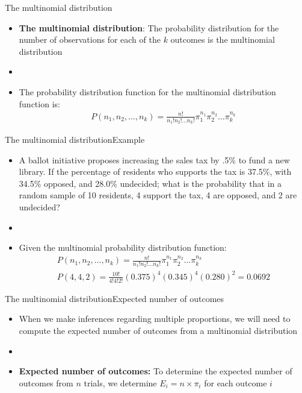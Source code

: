 \documentclass[xcolor=dvipsnames]{beamer}
\begin{document}
\begin{frame}{The multinomial distribution}
	\begin{itemize}
		\item \textbf{The multinomial distribution}: The probability distribution for the number of observations for each of the $k$ outcomes is the multinomial distribution \pause
		\item[]
		\item The probability distribution function for the multinomial distribution function is: \pause
		\begin{gather*}
			P(n_1, n_2, \hdots, n_k) = \frac{n!}{n_1!n_2!\hdots n_k!}\pi_1^{n_1}\pi_2^{n_2}\hdots \pi_k^{n_k}
		\end{gather*}
	\end{itemize}
\end{frame}

\begin{frame}{The multinomial distribution}{Example}
	\begin{itemize}
		\item A ballot initiative proposes increasing the sales tax by .5\% to fund a new library. If the percentage of residents who supports the tax is 37.5\%, with 34.5\% opposed, and 28.0\% undecided; what is the probability that in a random sample of 10 residents, 4 support the tax, 4 are opposed, and 2 are undecided? \pause
		\item[]
		\item Given the multinomial probability distribution function: \pause
		\begin{gather*}
			P(n_1, n_2, \hdots, n_k) = \frac{n!}{n_1!n_2!\hdots n_k!}\pi_1^{n_1}\pi_2^{n_2}\hdots \pi_k^{n_k} \\
			P(4, 4, 2) = \frac{10!}{4!4!2!}(0.375)^{4}(0.345)^{4}(0.280)^{2} = 0.0692
		\end{gather*}
	\end{itemize}
\end{frame}

\begin{frame}{The multinomial distribution}{Expected number of outcomes}
	\begin{itemize}
		\item When we make inferences regarding multiple proportions, we will need to compute the expected number of outcomes from a multinomial distribution \pause
		\item[]
		\item \textbf{Expected number of outcomes:} To determine the expected number of outcomes from $n$ trials, we determine $E_i = n\times \pi_i$ for each outcome $i$
	\end{itemize}
\end{frame}
\end{document}
